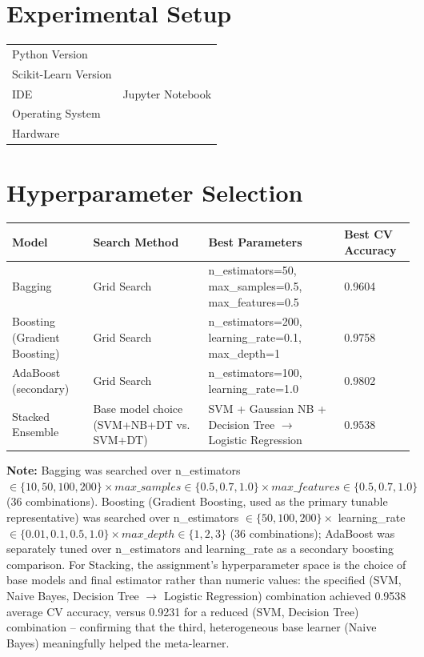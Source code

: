 \documentclass[12pt,a4paper]{article}
\begin{document}
\section{Experimental Setup}
\begin{tabular}{ll}
\toprule
Python Version & \\
Scikit-Learn Version & \\
IDE & Jupyter Notebook \\
Operating System & \\
Hardware & \\
\bottomrule
\end{tabular}

\section{Hyperparameter Selection}

\begin{longtable}{|p{2.6cm}|p{2.6cm}|p{5.7cm}|p{2.3cm}|}
\hline
\textbf{Model} & \textbf{Search Method} & \textbf{Best Parameters} & \textbf{Best CV Accuracy} \\ \hline
\endhead
Bagging & Grid Search & n\_estimators=50, max\_samples=0.5, max\_features=0.5 & 0.9604 \\ \hline
Boosting (Gradient Boosting) & Grid Search & n\_estimators=200, learning\_rate=0.1, max\_depth=1 & 0.9758 \\ \hline
AdaBoost (secondary) & Grid Search & n\_estimators=100, learning\_rate=1.0 & 0.9802 \\ \hline
Stacked Ensemble & Base model choice (SVM+NB+DT vs. SVM+DT) & SVM + Gaussian NB + Decision Tree $\rightarrow$ Logistic Regression & 0.9538 \\ \hline
\end{longtable}

\textbf{Note:} Bagging was searched over n\_estimators $\in \{10,50,100,200\} \times
max\_samples \in \{0.5,0.7,1.0\} \times max\_features \in \{0.5,0.7,1.0\}$ (36 combinations).
Boosting (Gradient Boosting, used as the primary tunable representative) was searched over
n\_estimators $\in \{50,100,200\} \times$ learning\_rate $\in \{0.01,0.1,0.5,1.0\} \times
max\_depth \in \{1,2,3\}$ (36 combinations); AdaBoost was separately tuned over n\_estimators
and learning\_rate as a secondary boosting comparison. For Stacking, the assignment's
hyperparameter space is the choice of base models and final estimator rather than numeric
values: the specified (SVM, Naive Bayes, Decision Tree $\to$ Logistic Regression) combination
achieved 0.9538 average CV accuracy, versus 0.9231 for a reduced (SVM, Decision Tree)
combination -- confirming that the third, heterogeneous base learner (Naive Bayes)
meaningfully helped the meta-learner.
\end{document}
